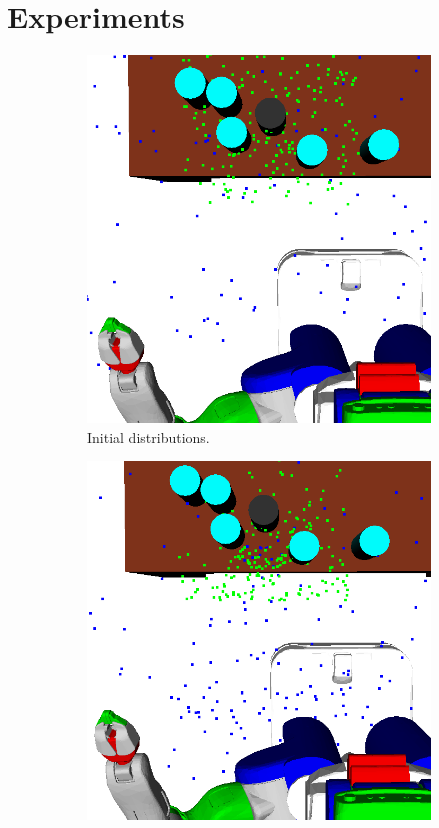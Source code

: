 \section{Experiments}
\begin{figure}[t]
  \vspace*{1em}
  \centering
  \begin{subfigure}[b]{0.35\linewidth}
    \includegraphics[width=\textwidth]{images/learns.png}
    \caption{Initial distributions.}
  \end{subfigure}
  \begin{subfigure}[b]{0.35\linewidth}
    \includegraphics[width=\textwidth]{images/learn4.png}

\end{subfigure}
\end{figure}
